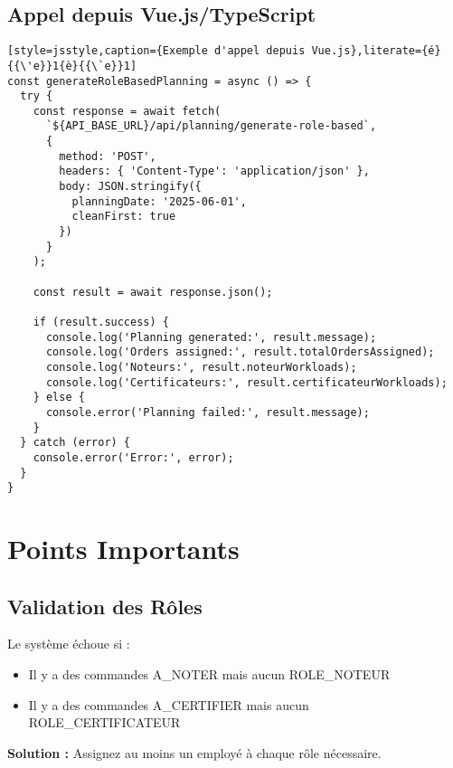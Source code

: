 \documentclass[11pt,a4paper]{article}
\begin{document}
    \subsection{Appel depuis Vue.js/TypeScript}

    \begin{lstlisting}[style=jsstyle,caption={Exemple d'appel depuis Vue.js},literate={é}{{\'e}}1{è}{{\`e}}1]
const generateRoleBasedPlanning = async () => {
  try {
    const response = await fetch(
      `${API_BASE_URL}/api/planning/generate-role-based`,
      {
        method: 'POST',
        headers: { 'Content-Type': 'application/json' },
        body: JSON.stringify({
          planningDate: '2025-06-01',
          cleanFirst: true
        })
      }
    );

    const result = await response.json();

    if (result.success) {
      console.log('Planning generated:', result.message);
      console.log('Orders assigned:', result.totalOrdersAssigned);
      console.log('Noteurs:', result.noteurWorkloads);
      console.log('Certificateurs:', result.certificateurWorkloads);
    } else {
      console.error('Planning failed:', result.message);
    }
  } catch (error) {
    console.error('Error:', error);
  }
}
    \end{lstlisting}

    \section{Points Importants}

    \subsection{Validation des Rôles}

    \begin{tcolorbox}[colback=warningbox,colframe=orange!75!black,title=\textbf{Attention}]
        Le système échoue si :
        \begin{itemize}
            \item Il y a des commandes A\_NOTER mais aucun ROLE\_NOTEUR
            \item Il y a des commandes A\_CERTIFIER mais aucun ROLE\_CERTIFICATEUR
        \end{itemize}

        \textbf{Solution :} Assignez au moins un employé à chaque rôle nécessaire.
    \end{tcolorbox}
\end{document}
